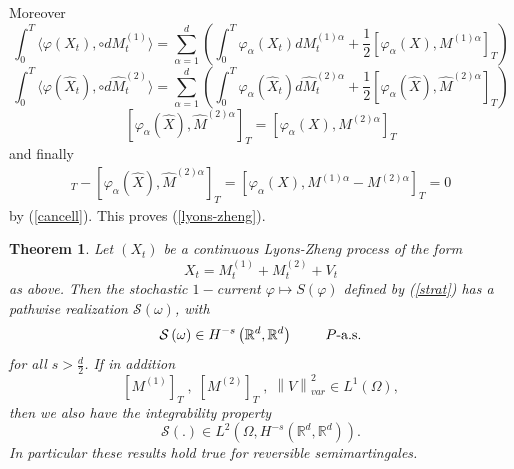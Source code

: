 \documentclass{article}
\newtheorem{theorem}{Theorem}
\begin{document}
Moreover 
\begin{equation*}
\int_{0}^{T}\langle \varphi \left( X_{t}\right) ,\circ dM_{t}^{\left(
1\right) }\rangle =\sum_{\alpha =1}^{d}\left( \int_{0}^{T}\varphi
_{\alpha }\left( X_{t}\right) dM_{t}^{\left( 1\right) \alpha }+\frac{1}{2}
[ \varphi _{\alpha }\left( X\right) ,M^{\left(
1\right) \alpha }] _{T}\right)
\end{equation*}
\begin{equation*}
\int_{0}^{T}\langle \varphi ( \hat{X}_{t}) ,\circ d\hat{M}%
_{t}^{\left( 2\right) }\rangle =\sum_{\alpha =1}^{d}\left(
\int_{0}^{T}\varphi _{\alpha }( \hat{X}_{t}) d\hat{M}_{t}^{\left(
2\right) \alpha }+\frac{1}{2} [ \varphi _{\alpha }( \hat{X}) ,%
\hat{M}^{\left( 2\right) \alpha }] _{T}\right)
\end{equation*}
\begin{equation*}
\left[ \varphi _{\alpha }\left( \hat{X}\right) ,\hat{M}^{\left( 2\right)
\alpha }\right] _{T}=\left[ \varphi _{\alpha }\left( X\right) ,M^{\left(
2\right) \alpha }\right] _{T}
\end{equation*}
and finally 
\begin{eqnarray*}
[ \varphi _{\alpha }\left( X\right) ,M^{\left( 1\right) \alpha }%
] _{T}-[ \varphi _{\alpha }( \hat{X}) ,\hat{M}^{\left(
2\right) \alpha }] _{T} 
=[ \varphi _{\alpha }\left( X\right) ,M^{\left( 1\right) \alpha
}-M^{\left( 2\right) \alpha }] _{T}=0
\end{eqnarray*}
by (\ref{cancell}). This proves (\ref{lyons-zheng}).

\begin{theorem}
Let $\left( X_{t}\right) $ be a continuous Lyons-Zheng process of the form 
\begin{equation*}
X_{t}=M_{t}^{\left( 1\right) }+M_{t}^{\left( 2\right) }+V_{t}
\end{equation*}
as above. Then the stochastic $1-$current $\varphi \mapsto S\left( \varphi
\right) $ defined by (\ref{strat}) has a pathwise realization $\mathcal{S}%
\left( \omega \right) $, with 
\begin{equation*}
\mathcal{S}\left( \omega \right) \in H^{-s}\left( \mathbb{R}^{d},\mathbb{R}%
^{d}\right) \text{ \qquad }P\text{-a.s.}
\end{equation*}
for all $s>\frac{d}{2}$. If in addition 
\begin{equation*}
\left[ M^{\left( 1\right) }\right] _{T}\;,\;\left[ M^{\left( 2\right) }%
\right] _{T}\;,\;\left\| V\right\| _{var}^{2}\in L^{1}\left( \Omega \right) ,
\end{equation*}
then we also have the integrability property 
\begin{equation*}
\mathcal{S}\left( .\right) \in L^{2}\left( \Omega ,H^{-s}\left( \mathbb{R}%
^{d},\mathbb{R}^{d}\right) \right) .
\end{equation*}
In particular these results hold true for reversible semimartingales.
\bigskip
\end{theorem}
\end{document}

